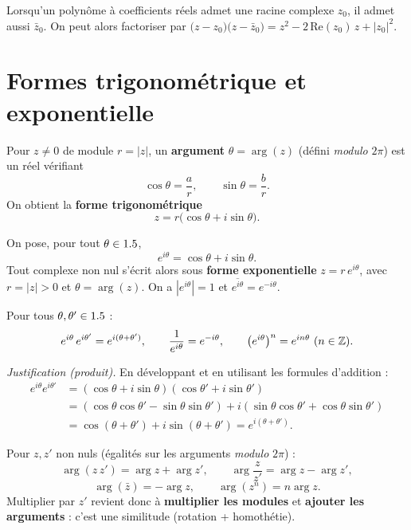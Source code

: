 \begin{remarque}
Lorsqu'un polynôme à coefficients réels admet une racine complexe $z_0$, il admet aussi $\bar z_0$.
On peut alors factoriser par $\big(z-z_0\big)\big(z-\bar z_0\big)=z^{2}-2\,\mathrm{Re}(z_0)\,z+|z_0|^{2}$.
\end{remarque}

\section{Formes trigonométrique et exponentielle}

\begin{definition}
Pour $z\neq0$ de module $r=|z|$, un \textbf{argument} $\theta=\arg(z)$ (défini \emph{modulo}
$2\pi$) est un réel vérifiant
\[
\cos\theta=\dfrac ar,\qquad \sin\theta=\dfrac br.
\]
On obtient la \textbf{forme trigonométrique}
\[
z=r\big(\cos\theta+i\sin\theta\big).
\]
\end{definition}

\begin{definition}
On pose, pour tout $\theta\in1.5$,
\[
e^{i\theta}=\cos\theta+i\sin\theta.
\]
Tout complexe non nul s'écrit alors sous \textbf{forme exponentielle} $z=r\,e^{i\theta}$, avec
$r=|z|>0$ et $\theta=\arg(z)$. On a $|e^{i\theta}|=1$ et $\overline{e^{i\theta}}=e^{-i\theta}$.
\end{definition}

\begin{theoreme}
Pour tous $\theta,\theta'\in1.5$ :
\[
e^{i\theta}\,e^{i\theta'}=e^{i(\theta+\theta')},\qquad \frac{1}{e^{i\theta}}=e^{-i\theta},\qquad
\big(e^{i\theta}\big)^{n}=e^{in\theta}\ (n\in\mathbb{Z}).
\]
\end{theoreme}

\noindent\emph{Justification (produit).} En développant et en utilisant les formules d'addition :
\begin{align*}
e^{i\theta}e^{i\theta'}&=(\cos\theta+i\sin\theta)(\cos\theta'+i\sin\theta')\\
&=(\cos\theta\cos\theta'-\sin\theta\sin\theta')+i(\sin\theta\cos\theta'+\cos\theta\sin\theta')\\
&=\cos(\theta+\theta')+i\sin(\theta+\theta')=e^{i(\theta+\theta')}.
\end{align*}

\begin{propriete}
Pour $z,z'$ non nuls (égalités sur les arguments \emph{modulo} $2\pi$) :
\[
\arg(z\,z')=\arg z+\arg z',\qquad \arg\!\dfrac z{z'}=\arg z-\arg z',
\]
\[
\arg(\bar z)=-\arg z,\qquad \arg(z^{n})=n\arg z.
\]
Multiplier par $z'$ revient donc à \textbf{multiplier les modules} et \textbf{ajouter les
arguments} : c'est une similitude (rotation + homothétie).
\end{propriete}

